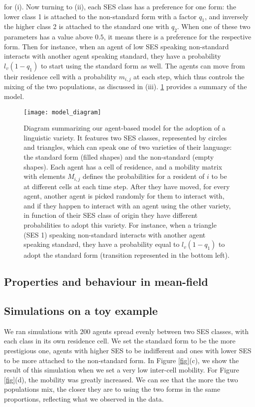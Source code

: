 \documentclass[../thesis.tex]{subfiles}
\begin{document}
for (i). Now turning to (ii), each \ac{SES} class has a preference for one form: the
lower class 1 is attached to the non-standard form with a factor $q_1$, and inversely
the higher class 2 is attached to the standard one with $q_2$. When one of these two
parameters has a value above $0.5$, it means there is a preference for the respective
form. Then for instance, when an agent of low \ac{SES} speaking non-standard interacts
with another agent speaking standard, they have a probability $l_v (1 - q_1)$ to start
using the standard form as well. The agents can move from their residence cell with a
probability $m_{i,j}$ at each step, which thus controls the mixing of the two
populations, as discussed in (iii). \cref{fig:model_diagram} provides a summary of the
model.
\begin{figure}
\centering
  \texttt{[image: model\_diagram]}
  \caption{Diagram summarizing our agent-based model for the adoption of a linguistic
  variety. It features two \ac{SES} classes, represented by circles and triangles, which
  can speak one of two varieties of their language: the standard form (filled shapes)
  and the non-standard (empty shapes). Each agent has a cell of residence, and a
  mobility matrix with elements $M_{i, j}$ defines the probabilities for a resident of
  $i$ to be at different cells at each time step. After they have moved, for every
  agent, another agent is picked randomly for them to interact with, and if they happen
  to interact with an agent using the other variety, in function of their \ac{SES} class
  of origin they have different probabilities to adopt this variety. For instance, when
  a triangle (\ac{SES} 1) speaking non-standard interacts with another agent speaking
  standard, they have a probability equal to $l_v (1 - q_1)$ to adopt the standard form
  (transition represented in the bottom left).}
  \label{fig:model_diagram}
\end{figure}




\subsection{Properties and behaviour in mean-field}


\subsection{Simulations on a toy example}
We ran simulations with $200$ agents spread evenly between two \ac{SES} classes, with each
class in its own residence cell. We set the standard form to be the more prestigious
one, agents with higher \ac{SES} to be indifferent and ones with lower \ac{SES} to be more
attached to the non-standard form. In Figure \cref{fig}(c), we show the result of this
simulation when we set a very low inter-cell mobility. For Figure \cref{fig}(d), the
mobility was greatly increased. We can see that the more the two populations mix, the
closer they are to using the two forms in the same proportions, reflecting what we
observed in the data.
\end{document}
